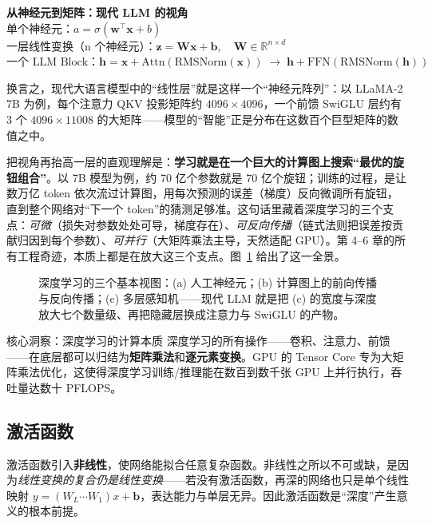\documentclass[12pt,a4paper]{article}
\begin{document}
\begin{center}
\textbf{从神经元到矩阵：现代 LLM 的视角}\\[4pt]
$\text{单个神经元：} a = \sigma(\mathbf{w}^\top \mathbf{x} + b)$\\[2pt]
$\text{一层线性变换（n 个神经元）：} \mathbf{z} = \mathbf{W}\mathbf{x} + \mathbf{b}, \quad \mathbf{W}\in\mathbb{R}^{n\times d}$\\[2pt]
$\text{一个 LLM Block：} \mathbf{h} = \mathbf{x} + \text{Attn}(\text{RMSNorm}(\mathbf{x})) \;\longrightarrow\; \mathbf{h} + \text{FFN}(\text{RMSNorm}(\mathbf{h}))$
\end{center}

换言之，现代大语言模型中的“线性层”就是这样一个“神经元阵列”：以 LLaMA-2 7B 为例，每个注意力 QKV 投影矩阵约 $4096 \times 4096$，一个前馈 SwiGLU 层约有 3 个 $4096 \times 11008$ 的大矩阵——模型的“智能”正是分布在这数百个巨型矩阵的数值之中。

把视角再抬高一层的直观理解是：\textbf{学习就是在一个巨大的计算图上搜索“最优的旋钮组合”}。以 7B 模型为例，约 70 亿个参数就是 70 亿个旋钮；训练的过程，是让数万亿 token 依次流过计算图，用每次预测的误差（梯度）反向微调所有旋钮，直到整个网络对“下一个 token”的猜测足够准。这句话里藏着深度学习的三个支点：\emph{可微}（损失对参数处处可导，梯度存在）、\emph{可反向传播}（链式法则把误差按贡献归因到每个参数）、\emph{可并行}（大矩阵乘法主导，天然适配 GPU）。第 4--6 章的所有工程奇迹，本质上都是在放大这三个支点。图~\ref{fig:neuron} 给出了这一全景。

\begin{figure}[htbp]
\centering

\caption{深度学习的三个基本视图：(a) 人工神经元；(b) 计算图上的前向传播与反向传播；(c) 多层感知机——现代 LLM 就是把 (c) 的宽度与深度放大七个数量级、再把隐藏层换成注意力与 SwiGLU 的产物。}
\label{fig:neuron}
\end{figure}

\begin{infobox}{核心洞察：深度学习的计算本质}
深度学习的所有操作——卷积、注意力、前馈——在底层都可以归结为\textbf{矩阵乘法}和\textbf{逐元素变换}。GPU 的 Tensor Core 专为大矩阵乘法优化，这使得深度学习训练/推理能在数百到数千张 GPU 上并行执行，吞吐量达数十 PFLOPS。
\end{infobox}
\subsection{激活函数}
激活函数引入\textbf{非线性}，使网络能拟合任意复杂函数。非线性之所以不可或缺，是因为\emph{线性变换的复合仍是线性变换}——若没有激活函数，再深的网络也只是单个线性映射 $y=(W_L\cdots W_1)x+\mathbf{b}$，表达能力与单层无异。因此激活函数是“深度”产生意义的根本前提。
\end{document}
